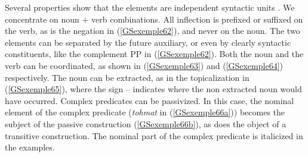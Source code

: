 \documentclass[output=paper
                ,modfonts
                ,nonflat
	        ,collection
	        ,collectionchapter
	        ,collectiontoclongg
 	        ,biblatex
                ,babelshorthands
                ,newtxmath
                ,draftmode
                ,colorlinks, citecolor=brown
]{./langsci/langscibook}
\begin{document}
{Several properties show that the elements are independent syntactic units \citep{Karimi-Doostan97a, Megerdoomian2002a, pollet2012grammaire}. We concentrate on noun $+$ verb combinations. All inflection is prefixed or suffixed on the verb, as is the negation in (\ref{GSexemple62}), and never on the noun. The two elements can be separated by the future auxiliary, or even by clearly syntactic constituents, like the complement PP in (\ref{GSexemple62}). Both the noun and the verb can be coordinated, as shown in (\ref{GSexemple63}) and (\ref{GSexemple64}) respectively. The noun can be extracted, as in the topicalization in (\ref{GSexemple65}), where the sign -- indicates where the non extracted noun would have occurred. Complex predicates can be passivized. In this case, the nominal element of the complex predicate (\emph{tohmat} in (\ref{GSexemple66a})) becomes the subject of the passive construction (\ref{GSexemple66b}), as does the object of a transitive construction. The nominal part of the complex predicate is italicized in the examples.

\z

\z

\z

\z

\eal
	\label{GSexemple66} 
	\label{GSexemple66a}
		
}
\end{document}

